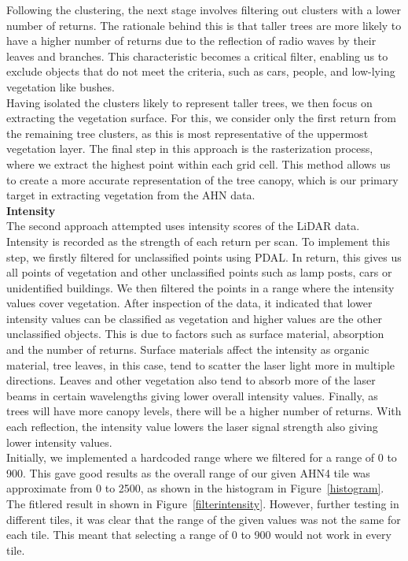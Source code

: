 \documentclass{article}
\begin{document}
\noindent Following the clustering, the next stage involves filtering out clusters with a lower number of returns. The rationale behind this is that taller trees are more likely to have a higher number of returns due to the reflection of radio waves by their leaves and branches. This characteristic becomes a critical filter, enabling us to exclude objects that do not meet the criteria, such as cars, people, and low-lying vegetation like bushes.\\

\noindent Having isolated the clusters likely to represent taller trees, we then focus on extracting the vegetation surface. For this, we consider only the first return from the remaining tree clusters, as this is most representative of the uppermost vegetation layer. The final step in this approach is the rasterization process, where we extract the highest point within each grid cell. This method allows us to create a more accurate representation of the tree canopy, which is our primary target in extracting vegetation from the AHN data.\\

\noindent\textbf{Intensity}\\
\noindent The second approach attempted uses intensity scores of the LiDAR data. Intensity is recorded as the strength of each return per scan. To implement this step, we firstly filtered for unclassified points using PDAL. In return, this gives us all points of vegetation and other unclassified points such as lamp posts, cars or unidentified buildings. We then filtered the points in a range where the intensity values cover vegetation. After inspection of the data, it indicated that lower intensity values can be classified as vegetation and higher values are the other unclassified objects. This is due to factors such as surface material, absorption and the number of returns. Surface materials affect the intensity as organic material, tree leaves, in this case, tend to scatter the laser light more in multiple directions. Leaves and other vegetation also tend to absorb more of the laser beams in certain wavelengths giving lower overall intensity values. Finally, as trees will have more canopy levels, there will be a higher number of returns. With each reflection, the intensity value lowers the laser signal strength also giving lower intensity values.\\

\noindent Initially, we implemented a hardcoded range where we filtered for a range of 0 to 900. This gave good results as the overall range of our given AHN4 tile was approximate from 0 to 2500, as shown in the histogram in Figure~\ref{histogram}. The fitlered result in shown in Figure~\ref{filterintensity}. However, further testing in different tiles, it was clear that the range of the given values was not the same for each tile. This meant that selecting a range of 0 to 900 would not work in every tile.
\end{document}
